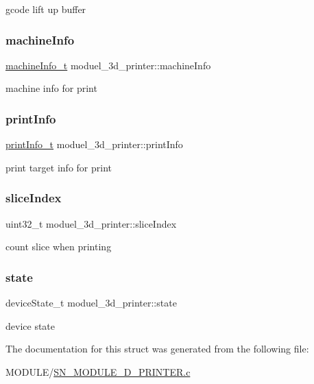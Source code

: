 gcode lift up buffer \mbox{\label{structmoduel__3d__printer_a06b1b5e4781c4fcd39a12202ec7fc116}} 
\subsubsection{\texorpdfstring{machine\+Info}{machineInfo}}
{\footnotesize\ttfamily \hyperlink{structmachine__information}{machine\+Info\+\_\+t} moduel\+\_\+3d\+\_\+printer\+::machine\+Info}

machine info for print \mbox{\label{structmoduel__3d__printer_a765c2d9f58cf2a23cd8c07b24a4e4b88}} 
\subsubsection{\texorpdfstring{print\+Info}{printInfo}}
{\footnotesize\ttfamily \hyperlink{structprint__information}{print\+Info\+\_\+t} moduel\+\_\+3d\+\_\+printer\+::print\+Info}

print target info for print \mbox{\label{structmoduel__3d__printer_a9a880c5b153a9a56bdd6be0c8ab8c6dd}} 
\subsubsection{\texorpdfstring{slice\+Index}{sliceIndex}}
{\footnotesize\ttfamily uint32\+\_\+t moduel\+\_\+3d\+\_\+printer\+::slice\+Index}

count slice when printing \mbox{\label{structmoduel__3d__printer_a2707ace05a8c18a1367ef543d40d2408}} 
\subsubsection{\texorpdfstring{state}{state}}
{\footnotesize\ttfamily device\+State\+\_\+t moduel\+\_\+3d\+\_\+printer\+::state}

device state 

The documentation for this struct was generated from the following file\+:\begin{DoxyCompactItemize}
\item 
M\+O\+D\+U\+L\+E/\hyperlink{SN__MODULE__3D__PRINTER_8c}{S\+N\+\_\+\+M\+O\+D\+U\+L\+E\+\_\+D\+\_\+\+P\+R\+I\+N\+T\+E\+R.\+c}\end{DoxyCompactItemize}
